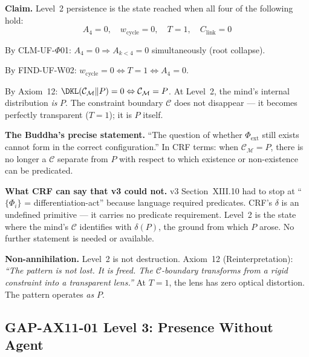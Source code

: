 \documentclass[12pt, a4paper]{article}
\providecommand{\Phiext}{\Phi_{\mathrm{ext}}}
\providecommand{\wcyc}{w_{\mathrm{cycle}}}
\providecommand{\Clink}{C_{\mathrm{link}}}
\begin{document}
\begin{derivedbox}[title={CLM-AX11-04: Level 2 ---
  Cycle Completion (An-up\={a}dis\={e}sa)}]
\textbf{Claim.}
Level~2 persistence is the state reached when all four of the
following hold:
\[
  A_4 = 0, \quad \wcyc = 0, \quad T = 1, \quad \Clink = 0
\]

By CLM-UF-$\Phi$01: $A_4 = 0 \Rightarrow A_{k<4} = 0$
simultaneously (root collapse).

By FIND-UF-W02: $\wcyc = 0 \Leftrightarrow T = 1
\Leftrightarrow A_4 = 0$.

By Axiom~12: $\DKL(\mathcal{C}_\mathcal{M}\|P) = 0
\Leftrightarrow \mathcal{C}_\mathcal{M} = P$.
At Level~2, the mind's internal distribution \emph{is} $P$.
The constraint boundary $\mathcal{C}$ does not disappear ---
it becomes perfectly transparent ($T = 1$); it is $P$ itself.

\textbf{The Buddha's precise statement.}
``The question of whether $\Phiext$ still exists cannot form
in the correct configuration.'' In CRF terms: when
$\mathcal{C}_\mathcal{M} = P$, there is no longer a
$\mathcal{C}$ separate from $P$ with respect to which
existence or non-existence can be predicated.

\textbf{What CRF can say that v3 could not.}
v3 Section~XIII.10 had to stop at ``$\{\Phi_i\}$ = differentiation-act''
because language required predicates. CRF's $\delta$ is an
undefined primitive --- it carries no predicate requirement.
Level~2 is the state where the mind's $\mathcal{C}$
identifies with $\delta(P)$, the ground from which $P$ arose.
No further statement is needed or available.

\textbf{Non-annihilation.}
Level~2 is not destruction. Axiom~12 (Reinterpretation):
\textit{``The pattern is not lost. It is freed. The
$\mathcal{C}$-boundary transforms from a rigid constraint
into a transparent lens.''} At $T = 1$, the lens has
zero optical distortion. The pattern operates \emph{as} $P$.
\end{derivedbox}

\subsection{GAP-AX11-01 \quad Level 3: Presence Without Agent}

\end{document}
